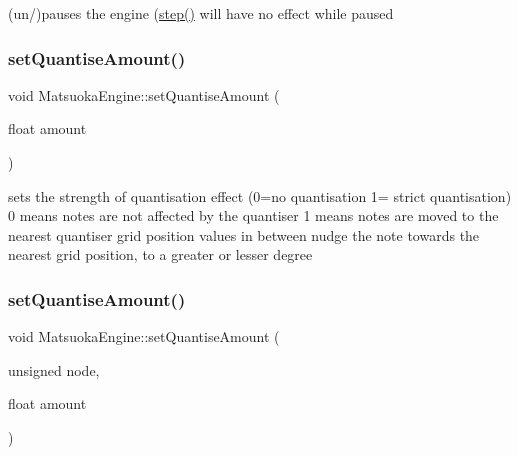 (un/)pauses the engine (\mbox{\hyperlink{classMatsuokaEngine_a4fa468dc0814f1ad92594f7a4d5abd00}{step()}} will have no effect while paused 

\mbox{\label{classMatsuokaEngine_a9057153267968489cd83ca31a1fbd985}} 
\subsubsection{\texorpdfstring{set\+Quantise\+Amount()}{setQuantiseAmount()}\hspace{0.1cm}{\footnotesize\ttfamily [1/2]}}
{\footnotesize\ttfamily void Matsuoka\+Engine\+::set\+Quantise\+Amount (\begin{DoxyParamCaption}\item[{float}]{amount }\end{DoxyParamCaption})}

sets the strength of quantisation effect (0=no quantisation 1= strict quantisation) 0 means notes are not affected by the quantiser 1 means notes are moved to the nearest quantiser grid position values in between nudge the note towards the nearest grid position, to a greater or lesser degree \mbox{\label{classMatsuokaEngine_ae053fd0bdd438fa8a7f4cbd151122f89}} 
\subsubsection{\texorpdfstring{set\+Quantise\+Amount()}{setQuantiseAmount()}\hspace{0.1cm}{\footnotesize\ttfamily [2/2]}}
{\footnotesize\ttfamily void Matsuoka\+Engine\+::set\+Quantise\+Amount (\begin{DoxyParamCaption}\item[{unsigned}]{node,  }\item[{float}]{amount }\end{DoxyParamCaption})}

\mbox{\label{classMatsuokaEngine_a23ee17f0e948af6fcccdaeefa2c4e246}} 
